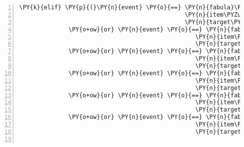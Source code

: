 \begin{Verbatim}[commandchars=\\\{\},numbers=left,firstnumber=1,stepnumber=1]
        \PY{k}{elif} \PY{p}{(}\PY{n}{event} \PY{o}{==} \PY{n}{fabula}\PY{o}{.}\PY{n}{TriesToDropEvent}\PY{p}{(}\PY{n}{identifier}\PY{o}{=}\PY{n}{ID\PYZus{}CASSANDRA}\PY{p}{,}
                                               \PY{n}{item\PYZus{}identifier}\PY{o}{=}\PY{l+s}{\PYZsq{}}\PY{l+s}{pry}\PY{l+s}{\PYZsq{}}\PY{p}{,}
                                               \PY{n}{target\PYZus{}identifier}\PY{o}{=}\PY{l+s}{\PYZsq{}}\PY{l+s}{teleport\PYZus{}default}\PY{l+s}{\PYZsq{}}\PY{p}{)}
              \PY{o+ow}{or} \PY{n}{event} \PY{o}{==} \PY{n}{fabula}\PY{o}{.}\PY{n}{TriesToDropEvent}\PY{p}{(}\PY{n}{identifier}\PY{o}{=}\PY{n}{ID\PYZus{}CASSANDRA}\PY{p}{,}
                                                  \PY{n}{item\PYZus{}identifier}\PY{o}{=}\PY{l+s}{\PYZsq{}}\PY{l+s}{pry}\PY{l+s}{\PYZsq{}}\PY{p}{,}
                                                  \PY{n}{target\PYZus{}identifier}\PY{o}{=}\PY{l+s}{\PYZsq{}}\PY{l+s}{teleport\PYZus{}entry}\PY{l+s}{\PYZsq{}}\PY{p}{)}
              \PY{o+ow}{or} \PY{n}{event} \PY{o}{==} \PY{n}{fabula}\PY{o}{.}\PY{n}{TriesToDropEvent}\PY{p}{(}\PY{n}{identifier}\PY{o}{=}\PY{n}{ID\PYZus{}CASSANDRA}\PY{p}{,}
                                                  \PY{n}{item\PYZus{}identifier}\PY{o}{=}\PY{l+s}{\PYZsq{}}\PY{l+s}{cake}\PY{l+s}{\PYZsq{}}\PY{p}{,}
                                                  \PY{n}{target\PYZus{}identifier}\PY{o}{=}\PY{l+s}{\PYZsq{}}\PY{l+s}{teleport\PYZus{}default}\PY{l+s}{\PYZsq{}}\PY{p}{)}
              \PY{o+ow}{or} \PY{n}{event} \PY{o}{==} \PY{n}{fabula}\PY{o}{.}\PY{n}{TriesToDropEvent}\PY{p}{(}\PY{n}{identifier}\PY{o}{=}\PY{n}{ID\PYZus{}CASSANDRA}\PY{p}{,}
                                                  \PY{n}{item\PYZus{}identifier}\PY{o}{=}\PY{l+s}{\PYZsq{}}\PY{l+s}{cake}\PY{l+s}{\PYZsq{}}\PY{p}{,}
                                                  \PY{n}{target\PYZus{}identifier}\PY{o}{=}\PY{l+s}{\PYZsq{}}\PY{l+s}{teleport\PYZus{}entry}\PY{l+s}{\PYZsq{}}\PY{p}{)}
              \PY{o+ow}{or} \PY{n}{event} \PY{o}{==} \PY{n}{fabula}\PY{o}{.}\PY{n}{TriesToDropEvent}\PY{p}{(}\PY{n}{identifier}\PY{o}{=}\PY{n}{ID\PYZus{}CASSANDRA}\PY{p}{,}
                                                  \PY{n}{item\PYZus{}identifier}\PY{o}{=}\PY{l+s}{\PYZsq{}}\PY{l+s}{lute\PYZus{}broken}\PY{l+s}{\PYZsq{}}\PY{p}{,}
                                                  \PY{n}{target\PYZus{}identifier}\PY{o}{=}\PY{l+s}{\PYZsq{}}\PY{l+s}{teleport\PYZus{}default}\PY{l+s}{\PYZsq{}}\PY{p}{)}
              \PY{o+ow}{or} \PY{n}{event} \PY{o}{==} \PY{n}{fabula}\PY{o}{.}\PY{n}{TriesToDropEvent}\PY{p}{(}\PY{n}{identifier}\PY{o}{=}\PY{n}{ID\PYZus{}CASSANDRA}\PY{p}{,}
                                                  \PY{n}{item\PYZus{}identifier}\PY{o}{=}\PY{l+s}{\PYZsq{}}\PY{l+s}{lute\PYZus{}broken}\PY{l+s}{\PYZsq{}}\PY{p}{,}
                                                  \PY{n}{target\PYZus{}identifier}\PY{o}{=}\PY{l+s}{\PYZsq{}}\PY{l+s}{teleport\PYZus{}entry}\PY{l+s}{\PYZsq{}}\PY{p}{)}\PY{p}{)}\PY{p}{:}


\end{Verbatim}
